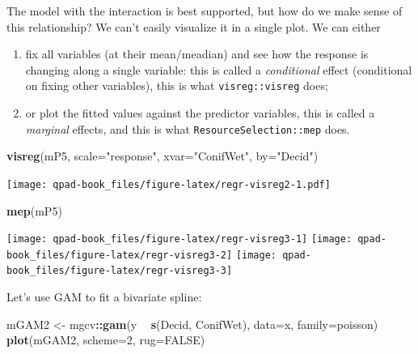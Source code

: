 \documentclass[12pt,]{book}
\newenvironment{Shaded}{\begin{snugshade}}{\end{snugshade}}
\newcommand{\DataTypeTok}[1]{\textcolor[rgb]{0.13,0.29,0.53}{#1}}
\newcommand{\DecValTok}[1]{\textcolor[rgb]{0.00,0.00,0.81}{#1}}
\newcommand{\KeywordTok}[1]{\textcolor[rgb]{0.13,0.29,0.53}{\textbf{#1}}}
\newcommand{\NormalTok}[1]{#1}
\newcommand{\OperatorTok}[1]{\textcolor[rgb]{0.81,0.36,0.00}{\textbf{#1}}}
\newcommand{\OtherTok}[1]{\textcolor[rgb]{0.56,0.35,0.01}{#1}}
\newcommand{\StringTok}[1]{\textcolor[rgb]{0.31,0.60,0.02}{#1}}
\providecommand{\tightlist}{%
  \setlength{\itemsep}{0pt}\setlength{\parskip}{0pt}}
\begin{document}
The model with the interaction is best supported, but how do we make sense of this
relationship? We can't easily visualize it in a single plot. We can either

\begin{enumerate}
\def\labelenumi{\arabic{enumi}.}
\tightlist
\item
  fix all variables (at their mean/meadian) and see how the response is changing along a single variable: this is called a \emph{conditional} effect (conditional on fixing other variables), this is what \texttt{visreg::visreg} does;
\item
  or plot the fitted values against the predictor variables, this is called a \emph{marginal} effects, and this is what \texttt{ResourceSelection::mep} does.
\end{enumerate}

\begin{Shaded}
\begin{Highlighting}[]
\KeywordTok{visreg}\NormalTok{(mP5, }\DataTypeTok{scale=}\StringTok{"response"}\NormalTok{, }\DataTypeTok{xvar=}\StringTok{"ConifWet"}\NormalTok{, }\DataTypeTok{by=}\StringTok{"Decid"}\NormalTok{)}
\end{Highlighting}
\end{Shaded}

\texttt{[image: qpad-book\_files/figure-latex/regr-visreg2-1.pdf]}

\begin{Shaded}
\begin{Highlighting}[]
\KeywordTok{mep}\NormalTok{(mP5)}
\end{Highlighting}
\end{Shaded}

\texttt{[image: qpad-book\_files/figure-latex/regr-visreg3-1]} \texttt{[image: qpad-book\_files/figure-latex/regr-visreg3-2]} \texttt{[image: qpad-book\_files/figure-latex/regr-visreg3-3]}

Let's use GAM to fit a bivariate spline:

\begin{Shaded}
\begin{Highlighting}[]
\NormalTok{mGAM2 <-}\StringTok{ }\NormalTok{mgcv}\OperatorTok{::}\KeywordTok{gam}\NormalTok{(y }\OperatorTok{~}\StringTok{ }\KeywordTok{s}\NormalTok{(Decid, ConifWet), }\DataTypeTok{data=}\NormalTok{x, }\DataTypeTok{family=}\NormalTok{poisson)}
\KeywordTok{plot}\NormalTok{(mGAM2, }\DataTypeTok{scheme=}\DecValTok{2}\NormalTok{, }\DataTypeTok{rug=}\OtherTok{FALSE}\NormalTok{)}
\end{Highlighting}
\end{Shaded}
\end{document}

